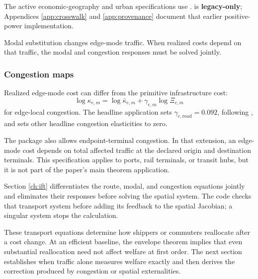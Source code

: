 The active economic-geography and urban specifications use
.  is \textbf{legacy-only}; Appendices
\ref{app:crosswalk} and \ref{app:provenance} document that earlier
positive-power implementation.

Modal substitution changes edge-mode traffic. When realized costs depend on
that traffic, the modal and congestion responses must be solved jointly.

\subsubsection{Congestion maps}

Realized edge-mode cost can differ from the primitive infrastructure cost:
\[
 \log\kappa_{e,m}
 =\log\bar\kappa_{e,m}
  +\gamma_{e,m}\log\Xi_{e,m}
\]
for edge-local congestion. The headline application sets
\(\gamma_{e,\mathrm{road}}=0.092\), following
\citet{AllenArkolakis2020}, and sets other headline congestion elasticities to
zero.

The package also allows endpoint-terminal congestion. In that extension, an
edge-mode cost depends on total affected traffic at the declared origin and
destination terminals. This specification applies to ports, rail terminals,
or transit hubs, but it is not part of the paper's main theorem application.

Section \ref{ch:ift} differentiates the route, modal, and congestion equations
jointly and eliminates their responses before solving the spatial system. The
code checks that transport system before adding its feedback to the spatial
Jacobian; a singular system stops the calculation.


These transport equations determine how shippers or commuters reallocate
after a cost change. At an efficient baseline, the envelope theorem implies
that even substantial reallocation need not affect welfare at first order. The
next section establishes when traffic alone measures welfare exactly and then
derives the correction produced by congestion or spatial externalities.
